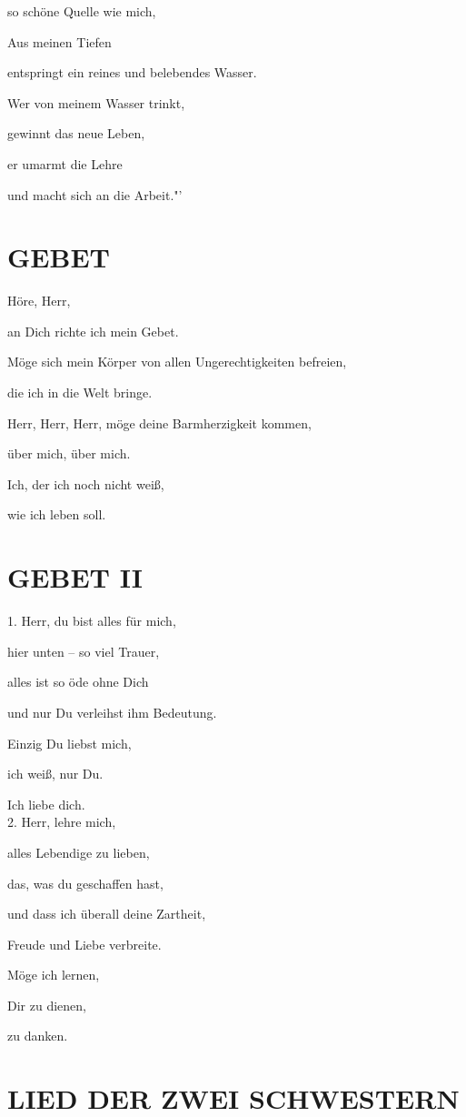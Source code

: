 \documentclass[11pt,a5paper,twoside]{article}
\begin{document}
so schöne Quelle wie mich, 

Aus meinen Tiefen 

entspringt ein reines und belebendes Wasser.

Wer von meinem Wasser trinkt, 

gewinnt das neue Leben,

er umarmt die Lehre 

und macht sich an die Arbeit."'

\section[Gebet]{GEBET}

Höre, Herr,

an Dich richte ich mein Gebet. 

Möge sich mein Körper von allen Ungerechtigkeiten befreien, 

die ich in die Welt bringe. 

Herr, Herr, Herr, möge deine Barmherzigkeit kommen,

über mich, über mich.

Ich, der ich noch nicht weiß,

wie ich leben soll. 

\section[Gebet II]{GEBET II}

1. Herr, du bist alles für mich,

hier unten -- so viel Trauer,

alles ist so öde ohne Dich

und nur Du verleihst ihm Bedeutung.

Einzig Du liebst mich,

ich weiß, nur Du.

Ich liebe dich. \\


2. Herr, lehre mich,

alles Lebendige zu lieben,

das, was du geschaffen hast,

und dass ich überall deine Zartheit,

Freude und Liebe verbreite.

Möge ich lernen, 

Dir zu dienen,

zu danken. 

\section[Lied der zwei Schwestern]{LIED DER ZWEI SCHWESTERN}
\end{document}
